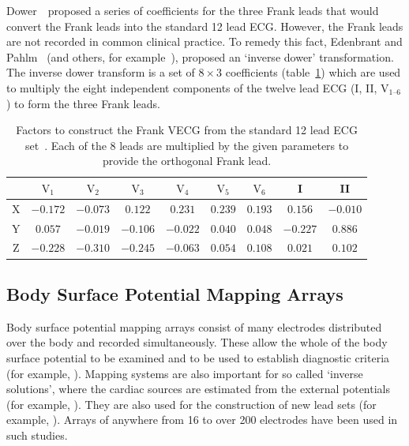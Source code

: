 Dower~\cite{Dower1980}\ proposed a series of coefficients for the three Frank
leads that would convert the Frank leads into the standard 12 lead ECG.
However, the Frank leads are not recorded in common clinical practice.
To remedy this fact, Edenbrant and Pahlm~\cite{Edenbrandt1988} (and others, for
example~\cite{Uijen1988}), proposed an `inverse dower' transformation.
The inverse dower transform is a set of $8\times3$ coefficients
(table~\ref{tbl:intro:ecg:inverse_dower}) which are used to multiply the eight
independent components of the twelve lead ECG (I, II, $\text{V}_{\text{1--6}}$)
to form the three Frank leads.


\begin{table}
\caption[Inverse Dower Factors after Edenbrandt and Pahlm]{
\label{tbl:intro:ecg:inverse_dower}
Factors to construct the Frank VECG from the standard 12 lead ECG
set~\cite{Edenbrandt1988}.
Each of the 8 leads are multiplied by the given parameters to provide the
orthogonal Frank lead.
}
\begin{center}
\begin{tabular}{c c c c c c c c c}
\toprule
& $\text{V}_{\text{1}}$ &$\text{V}_{\text{2}}$ & $\text{V}_{\text{3}}$ &
$\text{V}_{\text{4}}$ & $\text{V}_{\text{5}}$ & $\text{V}_{\text{6}}$ & I & II \\
\midrule
X & $-0.172$ & $-0.073$ & $0.122$ & $0.231$ & $0.239$ & $0.193$ & $0.156$ & $-0.010$ \\
Y & $0.057$ & $-0.019$ & $-0.106$ & $-0.022$ & $0.040$ & $0.048$ & $-0.227$ & $0.886$ \\
Z & $-0.228$ & $-0.310$ & $-0.245$ & $-0.063$ & $0.054$ & $0.108$ & $0.021$ & $0.102$ \\
\bottomrule
\end{tabular}
\end{center}
\end{table}




\subsection{Body Surface Potential Mapping Arrays}

Body surface potential mapping arrays consist of many electrodes distributed
over the body and recorded simultaneously.
These allow the whole of the body surface potential to be examined and
to be used to establish diagnostic
criteria (for example, \cite{Dubuc1993,SippensGroenewegen1998}).
Mapping systems are also important for so called `inverse solutions', where the
cardiac sources are estimated from the external potentials (for example,
\cite{Ramanathan2006}).
They are also used for the construction of new lead sets (for example,
\cite{Sobieszczanska2007}).
Arrays of anywhere from 16 to over 200 electrodes have been used in such
studies.
